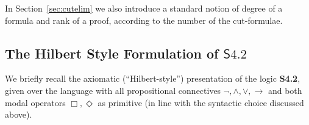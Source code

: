 \documentclass{article}
\newcommand{\logic}{\mathsf{S4.2}}
\theoremstyle{definition}
\begin{document}
 In Section~\ref{sec:cutelim} we also introduce a standard notion of degree of a formula and rank of a proof, according to the number of the cut-formulae.




\subsection{The Hilbert Style Formulation of \texorpdfstring{$\logic$}{S4.2}}

We briefly recall the axiomatic (``Hilbert-style'') presentation of the logic \textbf{S4.2}, given over the language with all propositional connectives $\neg, \wedge, \vee, \to$ and both modal operators $\Box, \Diamond$ as primitive (in line with the syntactic choice discussed above).

\bigskip
\end{document}
